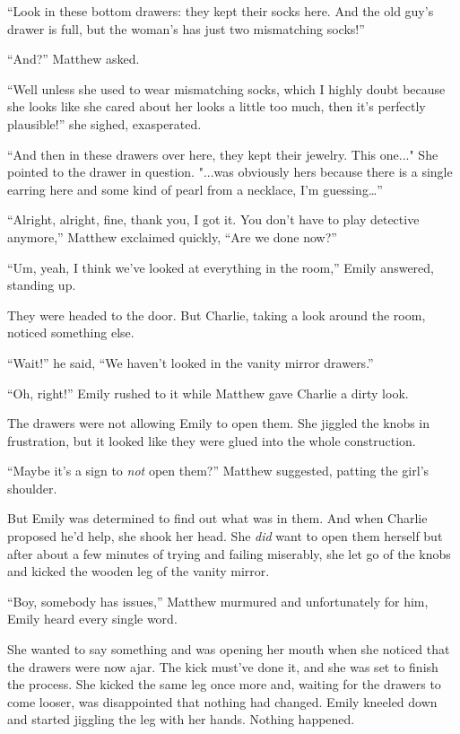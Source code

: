 “Look in these bottom drawers: they kept their socks here. And the old guy's drawer is full, but the woman's has just two mismatching socks!”

“And?” Matthew asked.

“Well unless she used to wear mismatching socks, which I highly doubt because she looks like she cared about her looks a little too much, then it's perfectly plausible!” she sighed, exasperated.

“And then in these drawers over here, they kept their jewelry. This one..." She pointed to the drawer in question. "...was obviously hers because there is a single earring here and some kind of pearl from a necklace, I'm guessing…”

“Alright, alright, fine, thank you, I got it. You don't have to play detective anymore,” Matthew exclaimed quickly, “Are we done now?”

“Um, yeah, I think we've looked at everything in the room,” Emily answered, standing up.

They were headed to the door. But Charlie, taking a look around the room, noticed something else.

“Wait!” he said, “We haven't looked in the vanity mirror drawers.”

“Oh, right!” Emily rushed to it while Matthew gave Charlie a dirty look.

The drawers were not allowing Emily to open them. She jiggled the knobs in frustration, but it looked like they were glued into the whole construction.

“Maybe it's a sign to \textit{not} open them?” Matthew suggested, patting the girl's shoulder.

But Emily was determined to find out what was in them. And when Charlie proposed he'd help, she shook her head. She \textit{did} want to open them herself but after about a few minutes of trying and failing miserably, she let go of the knobs and kicked the wooden leg of the vanity mirror.

“Boy, somebody has issues,” Matthew murmured and unfortunately for him, Emily heard every single word.

She wanted to say something and was opening her mouth when she noticed that the drawers were now ajar. The kick must've done it, and she was set to finish the process. She kicked the same leg once more and, waiting for the drawers to come looser, was disappointed that nothing had changed. Emily kneeled down and started jiggling the leg with her hands. Nothing happened.

